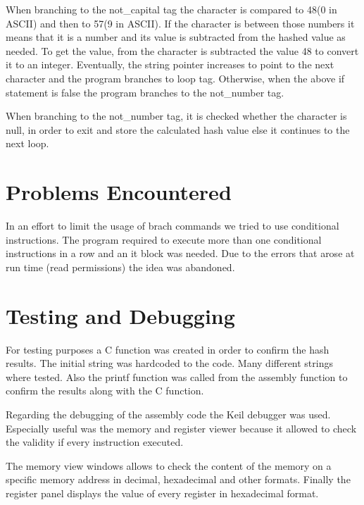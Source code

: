 \documentclass[a4paper, 12pt]{report}
\begin{document}
    When branching to the not\_capital tag the character is compared to 48(0 in ASCII) and then to 57(9 in ASCII).
    If the character is between those numbers it means that it is a number and its value is subtracted from the hashed
    value as needed. To get the value, from the character is subtracted the value 48 to convert it to an integer.
    Eventually, the string pointer increases to point to the next character and the program branches to loop tag.
    Otherwise, when the above if statement is false the program branches to the not\_number tag.

    When branching to the not\_number tag, it is checked whether the character is null, in order to exit and store 
    the calculated hash value else it continues to the next loop.
    
    \section*{Problems Encountered}

    In an effort to limit the usage of brach commands we tried to use conditional instructions. The program required
    to execute more than one conditional instructions in a row and an it block was needed. Due to the errors that 
    arose at run time (read permissions) the idea was abandoned.

    \section*{Testing and Debugging}

    For testing purposes a C function was created in order to confirm the hash results. The initial string was hardcoded
    to the code. Many different strings where tested. Also the printf function was called from the assembly function to 
    confirm the results along with the C function. 
    
    Regarding the debugging of the assembly code the Keil debugger was used. Especially useful was the memory and register viewer because it allowed 
    to check the validity if every instruction executed. 

    The memory view windows allows to check the content of the memory on a specific memory address in decimal, 
    hexadecimal and other formats. Finally the register panel displays the value of every register in hexadecimal
    format.

    
\end{document}
